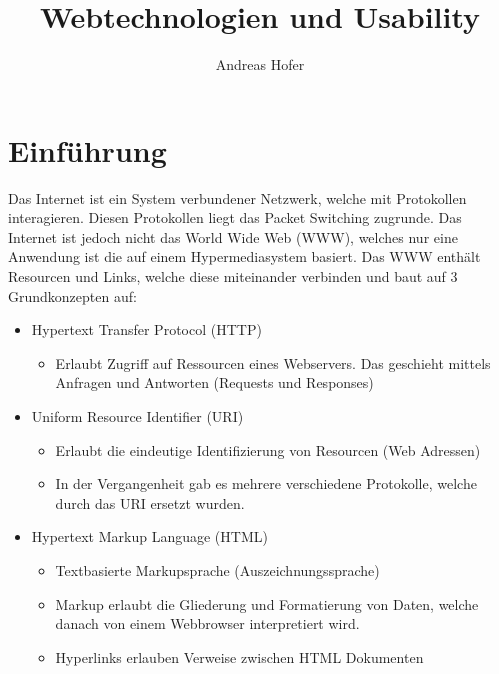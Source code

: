 \documentclass{article}
\title{\vspace{-1cm}Webtechnologien und Usability}
\author{Andreas Hofer}
\begin{document}
	\maketitle
	\tableofcontents
	\newpage
	\section{Einführung}
	Das Internet ist ein System verbundener Netzwerk, welche mit Protokollen interagieren. Diesen Protokollen liegt das Packet Switching zugrunde. Das Internet ist jedoch nicht das World Wide Web (WWW), welches nur eine Anwendung ist die auf einem Hypermediasystem basiert. Das WWW enthält Resourcen und Links, welche diese miteinander verbinden und baut auf 3 Grundkonzepten auf:
	\begin{itemize}
		\item{Hypertext Transfer Protocol (HTTP)}
		\begin{itemize}
			\item{Erlaubt Zugriff auf Ressourcen eines Webservers. Das geschieht mittels Anfragen und Antworten (Requests und Responses)}
		\end{itemize}
		\item{Uniform Resource Identifier (URI)}
		\begin{itemize}
			\item{Erlaubt die eindeutige Identifizierung von Resourcen (Web Adressen)}
			\item{In der Vergangenheit gab es mehrere verschiedene Protokolle, welche durch das URI ersetzt wurden.}
		\end{itemize}
		\item{Hypertext Markup Language (HTML)}
		\begin{itemize}
			\item{Textbasierte Markupsprache (Auszeichnungssprache)}
			\item{Markup erlaubt die Gliederung und Formatierung von Daten, welche danach von einem Webbrowser interpretiert wird.}
			\item{Hyperlinks erlauben Verweise zwischen HTML Dokumenten}
		\end{itemize}
	\end{itemize}
\end{document}
